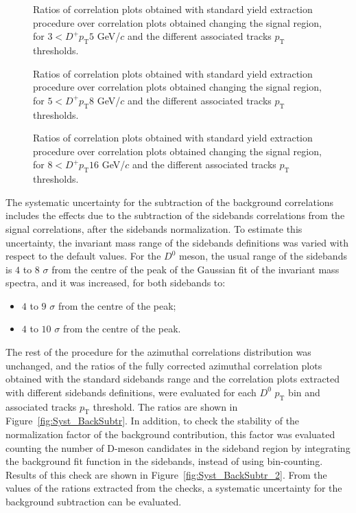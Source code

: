 \begin{figure}
\centering
{}
 \caption{Ratios of correlation plots obtained with standard yield extraction procedure over correlation plots obtained changing the signal region, for $3 < D^+ p_\text{T} 5$ GeV/$c$ and the different associated tracks $p_\text{T}$ thresholds.} \label{fig:Syst_DplusYield1}
\end{figure}
\begin{figure}
\centering
{}
 \caption{Ratios of correlation plots obtained with standard yield extraction procedure over correlation plots obtained changing the signal region, for $5 < D^+ p_\text{T} 8$ GeV/$c$ and the different associated tracks $p_\text{T}$ thresholds.} \label{fig:Syst_DplusYield2}
\end{figure}
\begin{figure}
\centering
{}
 \caption{Ratios of correlation plots obtained with standard yield extraction procedure over correlation plots obtained changing the signal region, for $8 < D^+ p_\text{T} 16$ GeV/$c$ and the different associated tracks $p_\text{T}$ thresholds.} \label{fig:Syst_DplusYield3}
\end{figure}

The systematic uncertainty for the subtraction of the background correlations includes the effects due to the subtraction of the sidebands correlations from the signal correlations, after the sidebands normalization. To estimate this uncertainty, the invariant mass range of the sidebands definitions was varied with respect to the default values. For the $D^0$ meson, the usual range of the sidebands is $4$ to $8$ $\sigma$ from the centre of the peak of the Gaussian fit of the invariant mass spectra, and it was increased, for both sidebands to:
\begin{itemize}
    \item $4$ to $9$ $\sigma$ from the centre of the peak;
    \item $4$ to $10$ $\sigma$ from the centre of the peak.
\end{itemize}
The rest of the procedure for the azimuthal correlations distribution was unchanged, and the ratios of the fully corrected azimuthal correlation plots obtained with the standard sidebands range and the correlation plots extracted with different sidebands definitions, were evaluated for each $D^0$ $p_\text{T}$ bin and associated tracks $p_\text{T}$ threshold. The ratios are shown in Figure~\ref{fig:Syst_BackSubtr}. In addition, to check the stability of the normalization factor of the background contribution, this factor was evaluated counting the number of D-meson candidates in the sideband region by integrating the background fit function in the sidebands, instead of using bin-counting. Results of this check are shown in Figure~\ref{fig:Syst_BackSubtr_2}. From the values of the rations extracted from the checks, a systematic uncertainty for the background subtraction can be evaluated.


